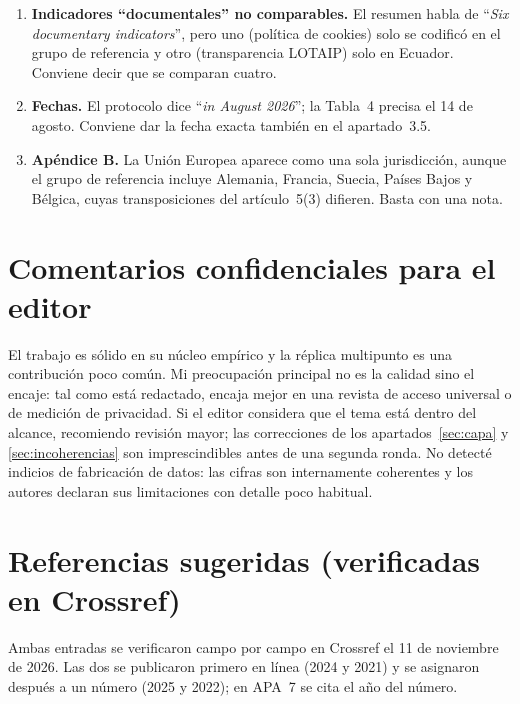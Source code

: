 \documentclass[11pt,a4paper]{article}
\newcommand{\cita}[1]{``\textit{#1}''}
\begin{document}
\begin{enumerate}
	\item \textbf{Indicadores ``documentales'' no comparables.} El resumen habla de \cita{Six documentary indicators}, pero uno (pol\'itica de cookies) solo se codific\'o en el grupo de referencia y otro (transparencia LOTAIP) solo en Ecuador. Conviene decir que se comparan cuatro.
	\item \textbf{Fechas.} El protocolo dice \cita{in August 2026}; la Tabla~4 precisa el 14 de agosto. Conviene dar la fecha exacta tambi\'en en el apartado~3.5.
	\item \textbf{Ap\'endice B.} La Uni\'on Europea aparece como una sola jurisdicci\'on, aunque el grupo de referencia incluye Alemania, Francia, Suecia, Pa\'ises Bajos y B\'elgica, cuyas transposiciones del art\'iculo~5(3) difieren. Basta con una nota.
\end{enumerate}

\section{Comentarios confidenciales para el editor}

El trabajo es s\'olido en su n\'ucleo emp\'irico y la r\'eplica multipunto es una contribuci\'on poco com\'un. Mi preocupaci\'on principal no es la calidad sino el encaje: tal como est\'a redactado, encaja mejor en una revista de acceso universal o de medici\'on de privacidad. Si el editor considera que el tema est\'a dentro del alcance, recomiendo revisi\'on mayor; las correcciones de los apartados~\ref{sec:capa} y \ref{sec:incoherencias} son imprescindibles antes de una segunda ronda. No detect\'e indicios de fabricaci\'on de datos: las cifras son internamente coherentes y los autores declaran sus limitaciones con detalle poco habitual.

\appendix
\section{Referencias sugeridas (verificadas en Crossref)}\label{sec:bib}

Ambas entradas se verificaron campo por campo en Crossref el 11 de noviembre de 2026. Las dos se publicaron primero en l\'inea (2024 y 2021) y se asignaron despu\'es a un n\'umero (2025 y 2022); en APA~7 se cita el a\~no del n\'umero.
\end{document}
